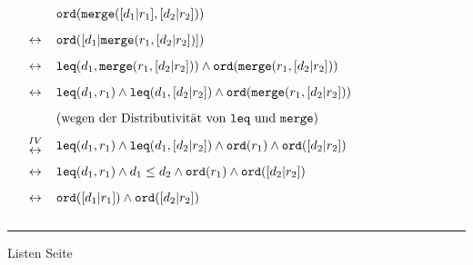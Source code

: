 \begin{slide}{}
\begin{enumerate}
\hspace*{-2cm}
      $
      \begin{array}{lcl}
      &                 & \mathtt{ord}(\mathtt{merge}([d_1|r_1], [d_2|r_2])) \\[0.3cm]
      & \leftrightarrow & \mathtt{ord}([d_1|\mathtt{merge}(r_1, [d_2|r_2])]) \\[0.3cm]
      & \leftrightarrow & \mathtt{leq}(d_1, \mathtt{merge}(r_1, [d_2|r_2])) \wedge \mathtt{ord}(\mathtt{merge}(r_1, [d_2|r_2])) \\[0.3cm]
      & \leftrightarrow & \mathtt{leq}(d_1, r_1) \wedge \mathtt{leq}(d_1, [d_2|r_2]) \wedge \mathtt{ord}(\mathtt{merge}(r_1, [d_2|r_2])) \\[0.3cm]
      &                 & (\mbox{wegen der Distributivit\"at von \texttt{leq} und \texttt{merge}})  \\[0.3cm]
      & {IV \atop \displaystyle\leftrightarrow} & 
        \mathtt{leq}(d_1, r_1) \wedge \mathtt{leq}(d_1, [d_2|r_2]) \wedge \mathtt{ord}(r_1) \wedge \mathtt{ord}([d_2|r_2]) \\[0.3cm]
      & \leftrightarrow & \mathtt{leq}(d_1, r_1) \wedge d_1 \leq d_2 \wedge \mathtt{ord}(r_1) \wedge \mathtt{ord}([d_2|r_2]) \\[0.3cm]
      & \leftrightarrow & \mathtt{ord}([d_1|r_1]) \wedge \mathtt{ord}([d_2|r_2]) \\[0.3cm]
      \end{array}
      $
\end{enumerate}

\vspace*{\fill}
\tiny \addtocounter{mypage}{1}
\rule{17cm}{1mm}
Listen  \hspace*{\fill} Seite 
\end{slide}


